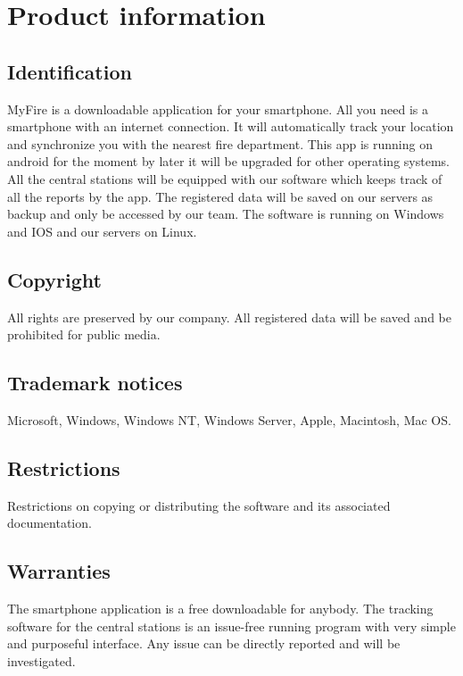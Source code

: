 \chapter{Product information}
\vspace{-6em}


\section{Identification}
MyFire is a downloadable application for your smartphone. All you need is a
smartphone with an internet connection. It will automatically track your
location and synchronize you with the nearest fire department. This app is
running on android for the moment by later it will be upgraded for other
operating systems. All the central stations will be equipped with our software
which keeps track of all the reports by the app. The registered data will be
saved on our servers as backup and only be accessed by our team. The software is
running on Windows and IOS and our servers on Linux.

\section{Copyright}

All rights are preserved by our company. All registered data will be saved and
be prohibited for public media. 

\section{Trademark notices}

Microsoft, Windows, Windows NT, Windows Server, Apple, Macintosh, Mac OS.

\section{Restrictions}

Restrictions on copying or distributing the software and its associated
documentation.

\section{Warranties}

The smartphone application is a free downloadable for anybody. The tracking
software for the central stations is an issue-free running program with very
simple and purposeful interface. Any issue can be directly reported and will be
investigated.

